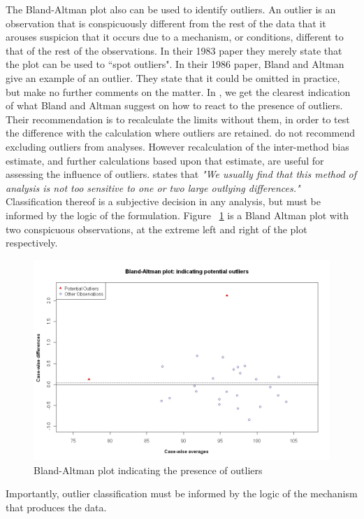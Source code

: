 \documentclass[12pt, a4paper]{report}
\theoremstyle{plain}
\theoremstyle{definition}
\theoremstyle{remark}
\begin{document}
The Bland-Altman plot also can be used to identify outliers. An outlier is an observation that is conspicuously different from the rest of the data that it arouses suspicion that it occurs due to a mechanism, or conditions, different to that of the rest of the observations. In their 1983 paper they merely state that the plot can be used to
``spot outliers". In their 1986 paper, Bland and Altman give an example of an
outlier. They state that it could be omitted in practice, but make
no further comments on the matter. In \citet{BA99}, we get the clearest indication of
what Bland and Altman suggest on how to react to the presence of
outliers. Their recommendation is to recalculate the limits
without them, in order to test the difference with the calculation
where outliers are retained. \citet*{BA99} do not recommend excluding outliers from analyses. However recalculation of the inter-method bias estimate, and further calculations based upon that estimate, are useful for assessing the influence of outliers. \citet{BA99} states that \emph{"We usually find that this method of analysis is not too sensitive to one or two large outlying differences."}
Classification thereof is a subjective decision in any analysis, but must be informed by the logic of the formulation. Figure ~\ref{BAOutliers} is a Bland Altman plot with two
conspicuous observations, at the extreme left and right of the
plot respectively.
	


	
	\begin{figure}[h!]
		\begin{center}
			\includegraphics[width=125mm]{images/BAOutliers.jpeg}
			\caption{Bland-Altman plot indicating the presence of outliers}\label{BAOutliers}
		\end{center}
	\end{figure}
Importantly, outlier classification must be informed by the logic of the mechanism that produces the data. 
\end{document}
